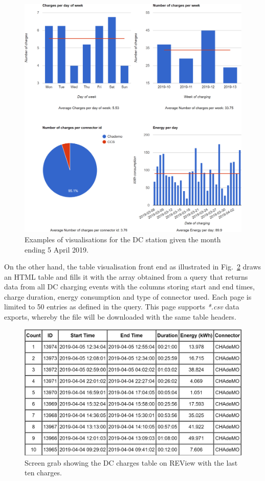 \begin{figure}[H]
	\centering
	\includegraphics[width=\linewidth]{dc-vis-crop}
	\caption[Examples of visualisations for the DC station]{Examples of visualisations for the DC station given the month ending 5 April 2019.}
	\label{fig:9:dcvis}
\end{figure}

On the other hand, the table visualisation front end as illustrated in Fig.~\ref{fig:9:dctbl} draws an HTML table and fills it with the array obtained from a query that returns data from all DC charging events with the columns storing start and end times, charge duration, energy consumption and type of connector used. Each page is limited to 50 entries as defined in the query. This page supports \textit{*.csv} data exports, whereby the file will be downloaded with the same table headers.

\begin{figure}[H]
	\centering
	\includegraphics[width=0.8\linewidth]{dc-table-crop}
	\caption[DC charges table]{Screen grab showing the DC charges table on REView with the last ten charges.}
	\label{fig:9:dctbl}
\end{figure}

